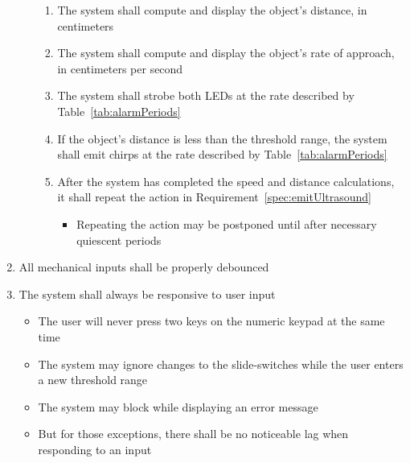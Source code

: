 \begin{enumerate}
\begin{enumerate}
\begin{enumerate}
                    \item The system shall compute and display the object's distance, in centimeters
                    \item The system shall compute and display the object's rate of approach, in centimeters per second
                    \item The system shall strobe both LEDs at the rate described by Table~\ref{tab:alarmPeriods}
                    \item If the object's distance is less than the threshold range, the system shall emit chirps at the rate described by Table~\ref{tab:alarmPeriods}
                    \item After the system has completed the speed and distance calculations, it shall repeat the action in Requirement~\ref{spec:emitUltrasound}
                        {\footnotesize
                        \begin{itemize}
                            \item Repeating the action may be postponed until after necessary quiescent periods
                        \end{itemize}}
                \end{enumerate}
        \end{enumerate}
    \item All mechanical inputs shall be properly debounced
    \item The system shall always be responsive to user input
        \begin{itemize}
            \item The user will never press two keys on the numeric keypad at the same time
            \item The system may ignore changes to the slide-switches while the user enters a new threshold range
            \item The system may block while displaying an error message
            \item But for those exceptions, there shall be no noticeable lag when responding to an input
        \end{itemize}
\end{enumerate}


